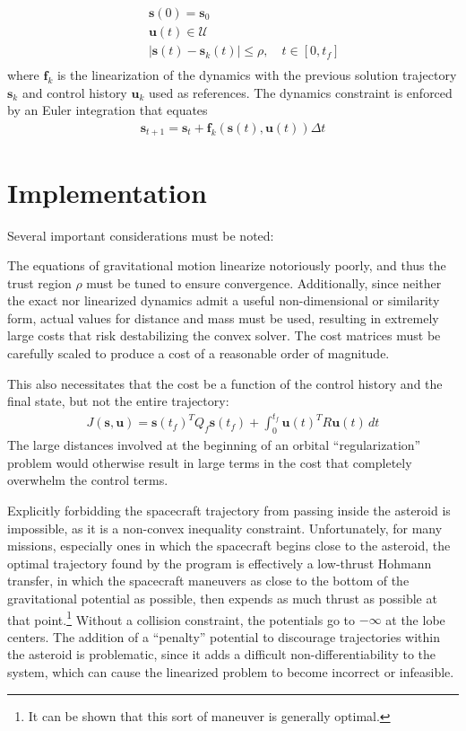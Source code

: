 \documentclass{article}
\begin{document}
\begin{multicols}{2}
\begin{align*}
	&\quad \mathbf{s}(0) = \mathbf{s}_{0}\\
	&\quad \mathbf{u}(t) \in \mathcal{U}\\
	&\quad |\mathbf{s}(t) - \mathbf{s}_{k}(t)| \le \rho, \quad t \in [0,t_{f}]\\
\end{align*}
where $\mathbf{f}_{k}$ is the linearization of the dynamics with the previous solution trajectory $\mathbf{s}_{k}$ and control history $\mathbf{u}_{k}$ used as references. The dynamics constraint is enforced by an Euler integration that equates 
\begin{align*}
	\mathbf{s}_{t+1} = \mathbf{s}_{t} + \mathbf{f}_{k}(\mathbf{s}(t), \mathbf{u}(t))\Delta t
\end{align*}


\section*{Implementation}
Several important considerations must be noted:

The equations of gravitational motion linearize notoriously poorly, and thus the trust region $\rho$ must be tuned to ensure convergence. Additionally, since neither the exact nor linearized dynamics admit a useful non-dimensional or similarity form, actual values for distance and mass must be used, resulting in extremely large costs that risk destabilizing the convex solver. The cost matrices must be carefully scaled to produce a cost of a reasonable order of magnitude.

This also necessitates that the cost be a function of the control history and the final state, but not the entire trajectory:
\begin{align*}
	J(\mathbf{s}, \mathbf{u}) = \mathbf{s}(t_{f})^{T}Q_{f}\mathbf{s}(t_{f}) + \int_{0}^{t_{f}} \mathbf{u}(t)^{T}R\mathbf{u}(t)\,dt
\end{align*}
The large distances involved at the beginning of an orbital ``regularization'' problem would otherwise result in large terms in the cost that completely overwhelm the control terms.

Explicitly forbidding the spacecraft trajectory from passing inside the asteroid is impossible, as it is a non-convex inequality constraint. Unfortunately, for many missions, especially ones in which the spacecraft begins close to the asteroid, the optimal trajectory found by the program is effectively a low-thrust Hohmann transfer, in which the spacecraft maneuvers as close to the bottom of the gravitational potential as possible, then expends as much thrust as possible at that point.\footnote{It can be shown that this sort of maneuver is generally optimal.} Without a collision constraint, the potentials go to $-\infty$ at the lobe centers. The addition of a ``penalty'' potential to discourage trajectories within the asteroid is problematic, since it adds a difficult non-differentiability to the system, which can cause the linearized problem to become incorrect or infeasible. 


\end{multicols}
\end{document}
